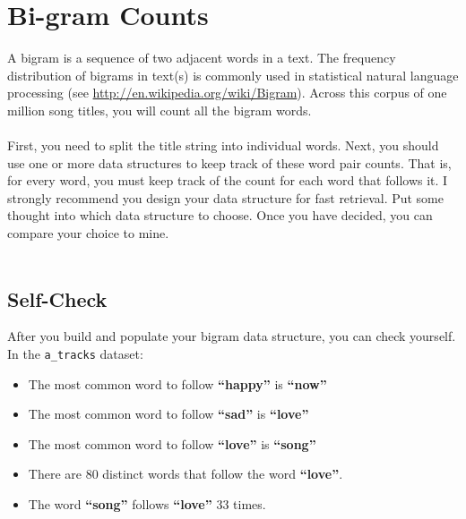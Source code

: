 \documentclass{article}
\begin{document}
\section*{Bi-gram Counts}
A bigram is a sequence of two adjacent words in a text. The frequency distribution of bigrams in text(s) is commonly used in statistical natural language processing (see \url{http://en.wikipedia.org/wiki/Bigram}). Across this corpus of one million song titles, you will count all the bigram words.
\\\\
First, you need to split the title string into individual words. Next, you should use one or more data structures to keep track of these word pair counts. That is, for every word, you must keep track of the count for each word that follows it. I strongly recommend you design your data structure for fast retrieval. Put some thought into which data structure to choose. Once you have decided, you can compare your choice to mine.
\\\\
\begin{tcolorbox}
 \section*{Self-Check}
 After you build and populate your bigram data structure, you can check yourself.\\
 In the \verb|a_tracks| dataset:
 \begin{itemize}
  \item The most common word to follow \textbf{``happy''} is \textbf{``now''}
  \item The most common word to follow \textbf{``sad''} is \textbf{``love''}
  \item The most common word to follow \textbf{``love''} is \textbf{``song''}
  \item There are 80 distinct words that follow the word \textbf{``love''}.
  \item The word \textbf{``song''} follows \textbf{``love''} 33 times.
 \end{itemize}

 
\end{tcolorbox}
\end{document}
